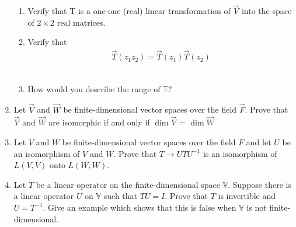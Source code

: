 \begin{enumerate}[label=\thesubsection.\arabic*.,ref=\thesubsection.\theenumi]
\begin{enumerate}
\item  Verify that T is a one-one (real) linear transformation of $\vec{V}$ into the space of $2 \times 2$ real matrices.
%
\\
\solution

\item Verify that
\begin{align}
    \vec{T}(z_1z_2)=\vec{T}(z_1)\vec{T}(z_2) \label{eq:solutions/3/3/5/1/b/eq:1}
\end{align}
%
\\
\solution

\item How would you describe the range of $\mathbb{T}$?
%
\\
\solution


\end{enumerate}
\item Let $\vec{V}$ and $\vec{W}$ be finite-dimensional vector spaces over the field $\vec{F}$. Prove that $\vec{V}$ and $\vec{W}$ are isomorphic if and only if $\dim{\vec{V}}$ = $\dim{\vec{W}}$
%
\\
\solution

\item Let $V$ and $W$ be finite-dimensional vector spaces over the field $F$ and let $U$ be an isomorphism of $V$ and $W$. Prove that $T \rightarrow UTU^{-1}$ is an isomorphism of $L(V,V)$ onto $L(W,W)$.
%
\\
\solution

%
\item Let $T$ be a linear operator on the finite-dimensional space $\mathbb{V}$. Suppose there is a linear operator $U$ on $\mathbb{V}$ such that $TU = I$. Prove that $T$ is invertible and $U = T^{-1}$. Give an example which shows that this is false when $\mathbb{V}$ is not finite-dimensional.
%
\\
\solution

\end{enumerate}
